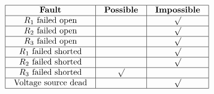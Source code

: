 

$$\vbox{\offinterlineskip
\halign{\strut
\vrule \quad\hfil # \ \hfil & 
\vrule \quad\hfil # \ \hfil & 
\vrule \quad\hfil # \ \hfil \vrule \cr
\noalign{\hrule}
%
{\bf Fault} & {\bf Possible} & {\bf Impossible} \cr
%
\noalign{\hrule}
%
$R_1$ failed open &  & $\surd$ \cr
%
\noalign{\hrule}
%
$R_2$ failed open &  & $\surd$ \cr
%
\noalign{\hrule}
%
$R_3$ failed open &  & $\surd$ \cr
%
\noalign{\hrule}
%
$R_1$ failed shorted &  & $\surd$ \cr
%
\noalign{\hrule}
%
$R_2$ failed shorted &  & $\surd$ \cr
%
\noalign{\hrule}
%
$R_3$ failed shorted & $\surd$ &  \cr
%
\noalign{\hrule}
%
Voltage source dead &  & $\surd$ \cr
%
\noalign{\hrule}
} %
}$$ %











